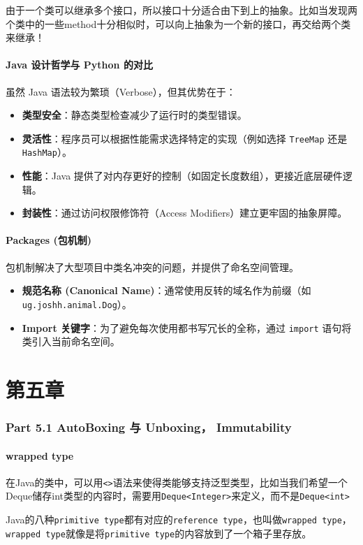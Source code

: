 \documentclass[12pt, a4paper, openany]{ctexbook} %
\begin{document}
由于一个类可以继承多个接口，所以接口十分适合由下到上的抽象。比如当发现两个类中的一些method十分相似时，可以向上抽象为一个新的接口，再交给两个类来继承！

\subsection{Java 设计哲学与 Python 的对比}
虽然 Java 语法较为繁琐（Verbose），但其优势在于：
\begin{itemize}
    \item \textbf{类型安全}：静态类型检查减少了运行时的类型错误。
    \item \textbf{灵活性}：程序员可以根据性能需求选择特定的实现（例如选择 \texttt{TreeMap} 还是 \texttt{HashMap}）。
    \item \textbf{性能}：Java 提供了对内存更好的控制（如固定长度数组），更接近底层硬件逻辑。
    \item \textbf{封装性}：通过访问权限修饰符（Access Modifiers）建立更牢固的抽象屏障。
\end{itemize}

\subsection{Packages (包机制)}
包机制解决了大型项目中类名冲突的问题，并提供了命名空间管理。
\begin{itemize}
    \item \textbf{规范名称 (Canonical Name)}：通常使用反转的域名作为前缀（如 \texttt{ug.joshh.animal.Dog}）。
    \item \textbf{Import 关键字}：为了避免每次使用都书写冗长的全称，通过 \texttt{import} 语句将类引入当前命名空间。
\end{itemize}

\part{第五章}
\section{Part 5.1 AutoBoxing 与 Unboxing， Immutability}

\subsection{wrapped type}
在Java的类中，可以用\texttt{<>}语法来使得类能够支持泛型类型，比如当我们希望一个Deque储存int类型的内容时，需要用\texttt{Deque<Integer>}来定义，而不是\texttt{Deque<int>}
\par
Java的八种\texttt{primitive type}都有对应的\texttt{reference type}，也叫做\texttt{wrapped type}，\texttt{wrapped type}就像是将\texttt{primitive type}的内容放到了一个箱子里存放。
\end{document}
